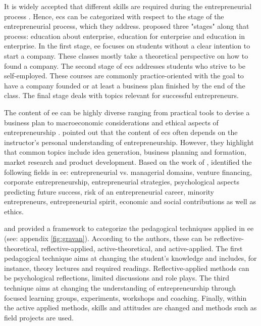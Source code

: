 It is widely accepted that different skills are required during the entrepreneurial process \citep{henry2005entrepreneurship}. Hence, \acp{ec} can be categorized with respect to the stage of the entrepreneurial process, which they address. \citet{jamieson1984education} proposed three "stages" along that process: education about enterprise, education for enterprise and education in enterprise. In the first stage, \ac{ee} focuses on students without a clear intention to start a company. These classes mostly take a theoretical perspective on how to found a company. The second stage of \acp{ec} addresses students who strive to be self-employed. These courses are commonly practice-oriented with the goal to have a company founded or at least a business plan finished by the end of the class. The final stage deals with topics relevant for successful entrepreneurs.

The content of \ac{ee} can be highly diverse ranging from practical tools to devise a business plan to macroeconomic considerations and ethical aspects of entrepreneurship \citep{kuratko2005emergence}. \citet{garavan1994entrepreneurship} pointed out that the content of \acp{ec} often depends on the instructor's personal understanding of entrepreneurship. However, they highlight that common topics include idea generation, business planning and formation, market research and product development. Based on the work of \citet{ronstadt1990the}, \citet{kuratko2005emergence} identified the following fields in \ac{ee}: entrepreneurial vs. managerial domains, venture financing, corporate entrepreneurship, entrepreneurial strategies, psychological aspects predicting future success, risk of an entrepreneurial career, minority entrepreneurs, entrepreneurial spirit, economic and social contributions as well as ethics.

\citet{garavan1994entrepreneurship} and \citet{randolph1979designing} provided a framework to categorize the pedagogical techniques applied in \ac{ee} (see: appendix \ref{fig:gravan}). According to the authors, these can be reflective-theoretical, reflective-applied, active-theoretical, and active-applied. The first pedagogical technique aims at changing the student's knowledge and includes, for instance, theory lectures and required readings. Reflective-applied methods can be psychological reflections, limited discussions and role plays. The third technique aims at changing the understanding of entrepreneurship through focused learning groups, experiments, workshops and coaching. Finally, within the active applied methods, skills and attitudes are changed and methods such as field projects are used. 

